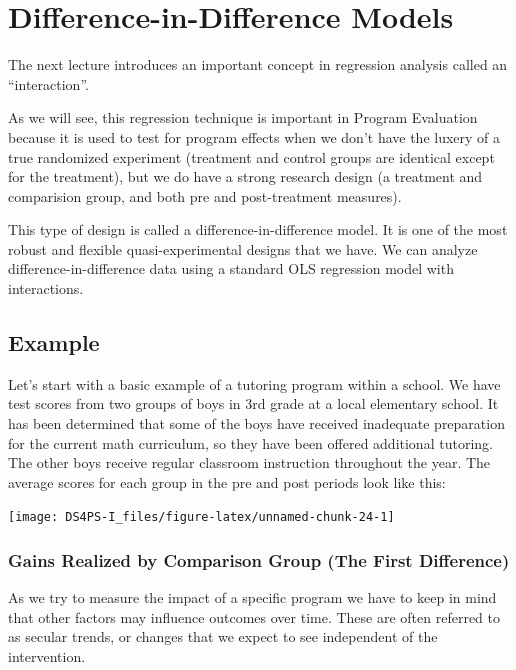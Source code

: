 \documentclass[]{book}
\theoremstyle{definition}
\theoremstyle{definition}
\theoremstyle{definition}
\theoremstyle{remark}
\begin{document}
\hypertarget{difference-in-difference-models}{%
\chapter{Difference-in-Difference
Models}\label{difference-in-difference-models}}

The next lecture introduces an important concept in regression analysis
called an ``interaction''.

As we will see, this regression technique is important in Program
Evaluation because it is used to test for program effects when we don't
have the luxery of a true randomized experiment (treatment and control
groups are identical except for the treatment), but we do have a strong
research design (a treatment and comparision group, and both pre and
post-treatment measures).

This type of design is called a difference-in-difference model. It is
one of the most robust and flexible quasi-experimental designs that we
have. We can analyze difference-in-difference data using a standard OLS
regression model with interactions.

\hypertarget{example}{%
\section{Example}\label{example}}

Let's start with a basic example of a tutoring program within a school.
We have test scores from two groups of boys in 3rd grade at a local
elementary school. It has been determined that some of the boys have
received inadequate preparation for the current math curriculum, so they
have been offered additional tutoring. The other boys receive regular
classroom instruction throughout the year. The average scores for each
group in the pre and post periods look like this:

\begin{center}\texttt{[image: DS4PS-I\_files/figure-latex/unnamed-chunk-24-1]} \end{center}

\hypertarget{gains-realized-by-comparison-group-the-first-difference}{%
\subsection{Gains Realized by Comparison Group (The First
Difference)}\label{gains-realized-by-comparison-group-the-first-difference}}

As we try to measure the impact of a specific program we have to keep in
mind that other factors may influence outcomes over time. These are
often referred to as secular trends, or changes that we expect to see
independent of the intervention.
\end{document}
